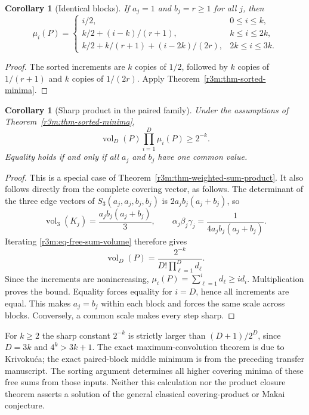 \documentclass[11pt,a4paper]{article}
\newtheorem{corollary}[theorem]{Corollary}
\theoremstyle{remark}\newtheorem{remark}[theorem]{Remark}
\begin{document}
\begin{corollary}[Identical blocks]
\label{r3m:cor-identical-blocks}
If $a_j=1$ and $b_j=r\ge1$ for all $j$, then
\[
 \mu_i(P)=
 \begin{cases}
  i/2,&0\le i\le k,\\[2pt]
  k/2+(i-k)/(r+1),&k\le i\le2k,\\[2pt]
  k/2+k/(r+1)+(i-2k)/(2r),&2k\le i\le3k.
 \end{cases}
\]
\end{corollary}

\begin{proof}
The sorted increments are $k$ copies of $1/2$, followed by $k$
copies of $1/(r+1)$ and $k$ copies of $1/(2r)$.
Apply Theorem~\ref{r3m:thm-sorted-minima}.
\end{proof}

\begin{corollary}[Sharp product in the paired family]
\label{r3m:cor-paired-product}
Under the assumptions of Theorem~\ref{r3m:thm-sorted-minima},
\[
 \operatorname{vol}_D(P)\prod_{i=1}^D\mu_i(P)\ge2^{-k}.
\]
Equality holds if and only if all $a_j$ and $b_j$ have one common
value.
\end{corollary}

\begin{proof}
This is a special case of
Theorem~\ref{r3m:thm-weighted-sum-product}.  It also follows directly
from the complete covering vector, as follows.
The determinant of the three edge vectors of
$S_3(a_j,a_j,b_j,b_j)$ is $2a_jb_j(a_j+b_j)$, so
\[
 \operatorname{vol}_3(K_j)=\frac{a_jb_j(a_j+b_j)}3,\qquad
 \alpha_j\beta_j\gamma_j=\frac1{4a_jb_j(a_j+b_j)}.
\]
Iterating \eqref{r3m:eq-free-sum-volume} therefore gives
\[
 \operatorname{vol}_D(P)
 =\frac{2^{-k}}{D!\prod_{\ell=1}^D d_\ell}.
\]
Since the increments are nonincreasing,
$\mu_i(P)=\sum_{\ell=1}^i d_\ell\ge i d_i$.
Multiplication proves the bound.
Equality forces equality for $i=D$, hence all increments are equal.
This makes $a_j=b_j$ within each block and forces the same scale
across blocks.  Conversely, a common scale makes every step sharp.
\end{proof}

For $k\ge2$ the sharp constant $2^{-k}$ is strictly larger than
$(D+1)/2^D$, since $D=3k$ and $4^k>3k+1$.
The exact maximum-convolution theorem is due to Krivoku\'ca;
the exact paired-block middle minimum is from the preceding
transfer manuscript.  The sorting argument determines all higher
covering minima of these free sums from those inputs.
Neither this calculation nor the product closure theorem asserts a
solution of the general classical covering-product or Makai conjecture.
\end{document}
